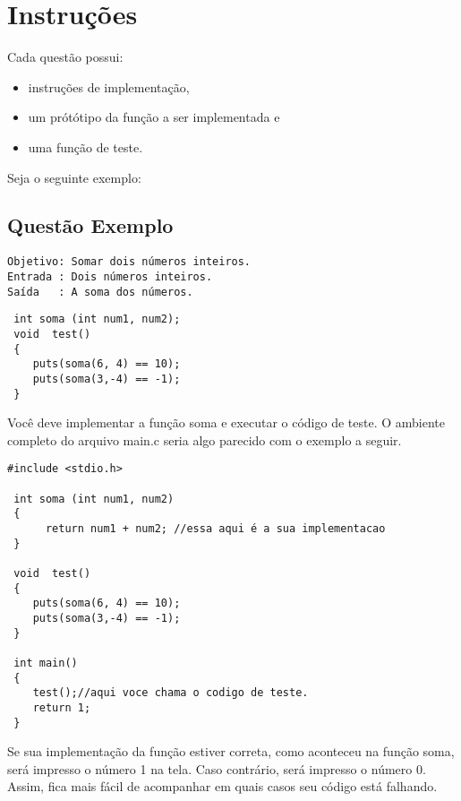 \clearpage
\section*{Instruções}
Cada questão possui: 
  \begin{itemize}
  \item instruções de implementação, 
  \item um prótótipo da função a ser implementada e 
  \item uma função de teste.
  \end{itemize}

                      
Seja o seguinte exemplo:
\subsection*{Questão Exemplo}
\begin{verbatim}
Objetivo: Somar dois números inteiros.
Entrada : Dois números inteiros.
Saída   : A soma dos números.
\end{verbatim}

\begin{lstlisting}
 int soma (int num1, num2);
 void  test()
 {
    puts(soma(6, 4) == 10);
    puts(soma(3,-4) == -1);
 }
\end{lstlisting}

Você deve implementar a função soma e executar o código de teste. O ambiente completo do arquivo main.c seria
algo parecido com o exemplo a seguir.

\begin{lstlisting}
#include <stdio.h>

 int soma (int num1, num2)
 {
      return num1 + num2; //essa aqui é a sua implementacao
 }
 
 void  test()
 {
    puts(soma(6, 4) == 10);
    puts(soma(3,-4) == -1);
 }
 
 int main()
 {
    test();//aqui voce chama o codigo de teste.
    return 1;
 }
\end{lstlisting}

Se sua implementação da função estiver correta, como aconteceu na função soma, será impresso o número 1 na tela. Caso contrário, 
será impresso o número 0. Assim, fica mais fácil de acompanhar em quais casos seu código está falhando.
